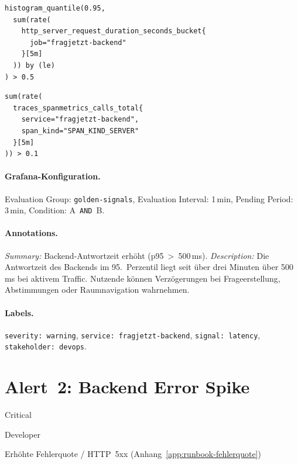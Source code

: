 \begin{lstlisting}[style=bashstyle, numbers=none]
histogram_quantile(0.95,
  sum(rate(
    http_server_request_duration_seconds_bucket{
      job="fragjetzt-backend"
    }[5m]
  )) by (le)
) > 0.5
\end{lstlisting}

\begin{lstlisting}[style=bashstyle, numbers=none]
sum(rate(
  traces_spanmetrics_calls_total{
    service="fragjetzt-backend",
    span_kind="SPAN_KIND_SERVER"
  }[5m]
)) > 0.1
\end{lstlisting}

\paragraph{Grafana-Konfiguration.}
Evaluation Group: \texttt{golden-signals}, Evaluation Interval: 1\,min, Pending Period: 3\,min, Condition: A~\texttt{AND}~B.

\paragraph{Annotations.}
\emph{Summary:} Backend-Antwortzeit erhöht (p95~>~500\,ms). \emph{Description:} Die Antwortzeit des Backends im 95.\ Perzentil liegt seit über drei Minuten über 500\,ms bei aktivem Traffic. Nutzende können Verzögerungen bei Frageerstellung, Abstimmungen oder Raumnavigation wahrnehmen.

\paragraph{Labels.}
\texttt{severity: warning}, \texttt{service: fragjetzt-backend}, \texttt{signal: latency}, \texttt{stakeholder: devops}.


\bigskip
\section{Alert~2: Backend Error Spike}

\begin{description}[style=sameline, leftmargin=5.4cm, labelwidth=4.6cm, labelsep=0.8cm]
  \item[Severity] Critical
  \item[Primäre Rolle] Developer
  \item[Zugehöriges Runbook] Erhöhte Fehlerquote / HTTP~5xx (Anhang~\ref{app:runbook-fehlerquote})
\end{description}

